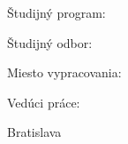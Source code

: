 


Študijný program: \myStudyProgram

Študijný odbor: \myDegreeCourse

Miesto vypracovania: \myInstitute

Vedúci práce: \mySupervisor

\medskip{}

Bratislava \myDate


\newpage
\thispagestyle{empty}
\mbox{}
\newpage

